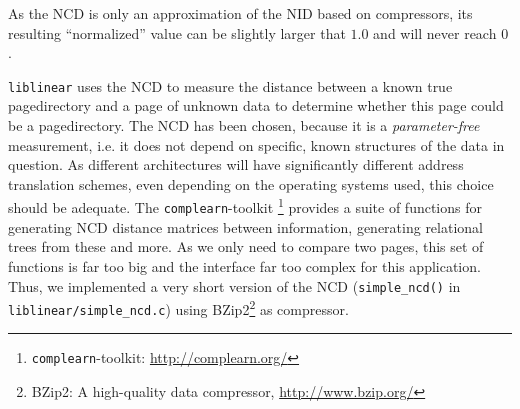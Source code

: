 As the NCD is only an approximation of the NID based on compressors, its
resulting ``normalized'' value can be slightly larger that $1.0$ and will never
reach $0$.

\texttt{liblinear} uses the NCD to measure the distance between a known true
pagedirectory and a page of unknown data to determine whether this page could be
a pagedirectory. The NCD has been chosen, because it is a \emph{parameter-free}
measurement, i.e. it does not depend on specific, known structures of the data
in question. As different architectures will have significantly different
address translation schemes, even depending on the operating systems used, this
choice should be adequate. The \texttt{complearn}-toolkit
\footnote{\texttt{complearn}-toolkit:
\href{http://complearn.org/}{http://complearn.org/}} provides a suite of
functions for generating NCD distance matrices between information, generating
relational trees from these and more.  As we only need to compare two pages,
this set of functions is far too big and the interface far too complex for this
application.  Thus, we implemented a very short version of the NCD
(\texttt{simple\_ncd()} in \texttt{liblinear/simple\_ncd.c}) using
BZip2\footnote{BZip2: A high-quality data compressor,
\href{http://www.bzip.org/}{http://www.bzip.org/}} as compressor.

